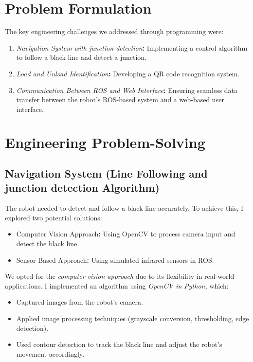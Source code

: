 \documentclass[a4paper,12pt]{extreport}
\begin{document}
\section{Problem Formulation}

The key engineering challenges we addressed through programming were:

\begin{enumerate}
\def\labelenumi{\arabic{enumi}.}
\item
  \emph{Navigation System with junction detection}\textbf{:}
  Implementing a control algorithm to follow a black line and detect a
  junction.
\item
  \emph{Load and Unload Identification}\textbf{:} Developing a QR code
  recognition system.
\item
  \emph{Communication Between ROS and Web Interface}\textbf{:} Ensuring
  seamless data transfer between the robot's ROS-based system and a
  web-based user interface.
\end{enumerate}

\section{Engineering Problem-Solving}

\subsection{Navigation System (Line Following and junction detection Algorithm)}

The robot needed to detect and follow a black line accurately. To
achieve this, I explored two potential solutions:

\begin{itemize}
\item
  Computer Vision Approach\textbf{:} Using OpenCV to process camera
  input and detect the black line.
\item
  Sensor-Based Approach\textbf{:} Using simulated infrared sensors in
  ROS.
\end{itemize}

We opted for the \emph{computer vision approach} due to its flexibility
in real-world applications. I implemented an algorithm using
\emph{OpenCV in Python,} which:

\begin{itemize}
\item
  Captured images from the robot's camera.
\item
  Applied image processing techniques (grayscale conversion,
  thresholding, edge detection).
\item
  Used contour detection to track the black line and adjust the robot's
  movement accordingly.
\end{itemize}
\end{document}
